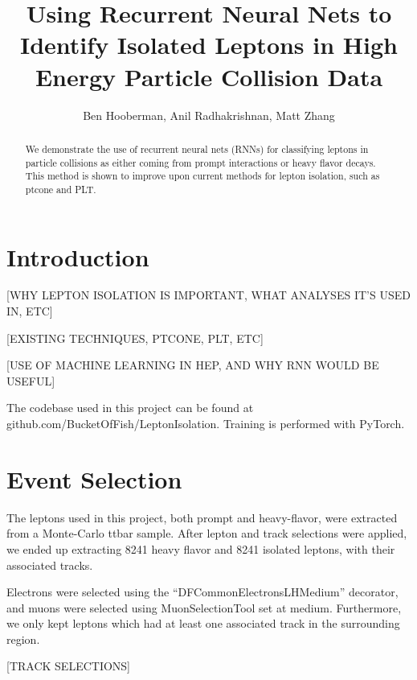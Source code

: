 \documentclass[preprint,12pt]{elsarticle}
\begin{document}
\begin{frontmatter}

\title{Using Recurrent Neural Nets to Identify Isolated Leptons in High Energy Particle Collision Data}

\author{Ben Hooberman, Anil Radhakrishnan, Matt Zhang}

\address{UIUC}

\begin{abstract}
We demonstrate the use of recurrent neural nets (RNNs) for classifying leptons in particle collisions as either coming from prompt interactions or heavy flavor decays. This method is shown to improve upon current methods for lepton isolation, such as ptcone and PLT.
\end{abstract}

\end{frontmatter}

\section{Introduction}\label{sec:intro}

[WHY LEPTON ISOLATION IS IMPORTANT, WHAT ANALYSES IT'S USED IN, ETC]

[EXISTING TECHNIQUES, PTCONE, PLT, ETC]

[USE OF MACHINE LEARNING IN HEP, AND WHY RNN WOULD BE USEFUL]

The codebase used in this project can be found at github.com/BucketOfFish/LeptonIsolation. Training is performed with PyTorch.

\section{Event Selection}\label{sec:selection}

The leptons used in this project, both prompt and heavy-flavor, were extracted from a Monte-Carlo ttbar sample.
After lepton and track selections were applied, we ended up extracting 8241 heavy flavor and 8241 isolated leptons, with their associated tracks.

Electrons were selected using the “DFCommonElectronsLHMedium” decorator, and muons were selected using MuonSelectionTool set at medium. Furthermore, we only kept leptons which had at least one associated track in the surrounding region.

[TRACK SELECTIONS]
\end{document}
